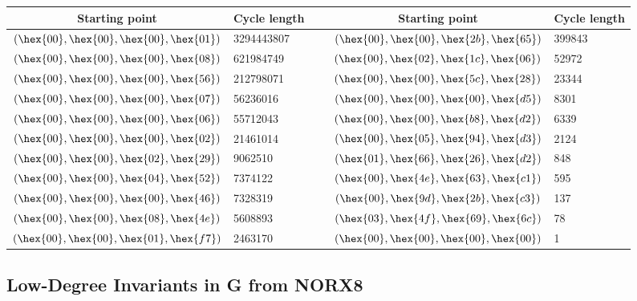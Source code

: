 \begin{table}[ht]
\begin{center}
\setlength{\tabcolsep}{.2cm}
\begin{tabular}{c|lcc|l}

Starting point & Cycle length & ~ & Starting point & Cycle length \\

\midrule

$(\hex{00},\hex{00},\hex{00},\hex{01})$ & 3294443807 & ~ & $(\hex{00},\hex{00},\hex{2b},\hex{65})$ & 399843 \\
$(\hex{00},\hex{00},\hex{00},\hex{08})$ & 621984749 & ~ & $(\hex{00},\hex{02},\hex{1c},\hex{06})$ & 52972 \\
$(\hex{00},\hex{00},\hex{00},\hex{56})$ & 212798071 & ~ & $(\hex{00},\hex{00},\hex{5c},\hex{28})$ & 23344 \\
$(\hex{00},\hex{00},\hex{00},\hex{07})$ & 56236016 & ~ & $(\hex{00},\hex{00},\hex{00},\hex{d5})$ & 8301 \\
$(\hex{00},\hex{00},\hex{00},\hex{06})$ & 55712043 & ~ & $(\hex{00},\hex{00},\hex{b8},\hex{d2})$ & 6339 \\
$(\hex{00},\hex{00},\hex{00},\hex{02})$ & 21461014 & ~ & $(\hex{00},\hex{05},\hex{94},\hex{d3})$ & 2124 \\
$(\hex{00},\hex{00},\hex{02},\hex{29})$ & 9062510 & ~ & $(\hex{01},\hex{66},\hex{26},\hex{d2})$ & 848 \\
$(\hex{00},\hex{00},\hex{04},\hex{52})$ & 7374122 & ~ & $(\hex{00},\hex{4e},\hex{63},\hex{c1})$ & 595 \\
$(\hex{00},\hex{00},\hex{00},\hex{46})$ & 7328319 & ~ & $(\hex{00},\hex{9d},\hex{2b},\hex{c3})$ & 137 \\
$(\hex{00},\hex{00},\hex{08},\hex{4e})$ & 5608893 & ~ & $(\hex{03},\hex{4f},\hex{69},\hex{6c})$ & 78 \\
$(\hex{00},\hex{00},\hex{01},\hex{f7})$ & 2463170 & ~ & $(\hex{00},\hex{00},\hex{00},\hex{00})$ & 1 \\

\end{tabular}
\end{center}
\end{table}


\subsection{Low-Degree Invariants in G from NORX8}


